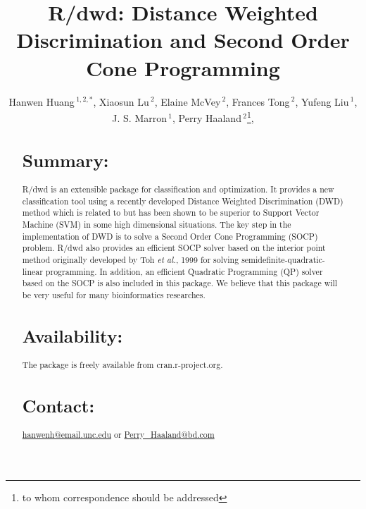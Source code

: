 \documentclass{bioinfo}
\begin{document}

\title[short Title]{R/dwd: Distance Weighted Discrimination and Second Order
Cone Programming}
\author[Sample \textit{et~al}]{Hanwen Huang\,$^{1,2,*}$,
Xiaosun Lu\,$^{2}$, Elaine McVey\,$^{2}$, Frances Tong\,$^{2}$, Yufeng
Liu\,$^{1}$, J. S. Marron\,$^1$, Perry Haaland\,$^{2}$\footnote{to whom
correspondence should be addressed}, \address{$^{1}$Department of Statistics
and Operations Research, University of North Carolina at Chapel Hill, Chapel
Hill, NC 27599 USA.\\ $^{2}$BD Technologies,
21 Davis Drive, RTP, NC 27709 USA.}}



\maketitle

\begin{abstract}

\section{Summary:}
R/dwd is an extensible package for classification and optimization. It provides
a new classification tool using a recently developed Distance Weighted
Discrimination (DWD) method which is related to but has been shown to be
superior to Support Vector Machine (SVM) in some high dimensional situations.
The key step in the implementation of DWD is to solve a Second Order Cone
Programming (SOCP) problem. R/dwd also provides an efficient SOCP solver based
on the interior point method originally developed by Toh {\em et al.}, 1999 for
solving semidefinite-quadratic-linear programming. In addition, an efficient
Quadratic Programming (QP) solver based on the SOCP is also included in this
package. We believe that this package will be very useful for many
bioinformatics researches.

\section{Availability:} The package is freely available from cran.r-project.org.

\section{Contact:} \href{hanwenh@email.unc.edu}{hanwenh@email.unc.edu} or
\href{Perry\_Haaland@bd.com}{Perry\_Haaland@bd.com}
\end{abstract}
\end{document}
